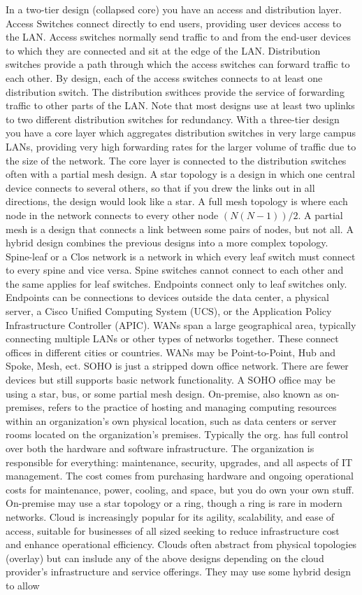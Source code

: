 \documentclass{article}
\begin{document}
	In a two-tier design (collapsed core) you have an access and distribution layer. Access Switches connect directly to end users, providing user devices access to the LAN. Access switches normally send traffic to and from the end-user devices to which they are connected and sit at the edge of the LAN. Distribution switches provide a path through which the access switches can forward traffic to each other. By design, each of the access switches connects to at least one distribution switch. The distribution swithces provide the service of forwarding traffic to other parts of the LAN. Note that most designs use at least two uplinks to two different distribution switches for redundancy. With a three-tier design you have a core layer which aggregates distribution switches in very large campus LANs, providing very high forwarding rates for the larger volume of traffic due to the size of the network. The core layer is connected to the distribution switches often with a partial mesh design. A star topology is a design in which one central device connects to several others, so that if you drew the links out in all directions, the design would look like a star. A full mesh topology is where each node in the network connects to every other node $(N(N-1))/2$. A partial mesh is a design that connects a link between some pairs of nodes, but not all. A hybrid design combines the previous designs into a more complex topology. Spine-leaf or a Clos network is a network in which every leaf switch must connect to every spine and vice versa. Spine switches cannot connect to each other and the same applies for leaf switches. Endpoints connect only to leaf switches only. Endpoints can be connections to devices outside the data center, a physical server, a Cisco Unified Computing System (UCS), or the Application Policy Infrastructure Controller (APIC). WANs span a large geographical area, typically connecting multiple LANs or other types of networks together. These connect offices in different cities or countries. WANs may be Point-to-Point, Hub and Spoke, Mesh, ect. SOHO is just a stripped down office network. There are fewer devices but still supports basic network functionality. A SOHO office may be using a star, bus, or some partial mesh design. On-premise, also known as on-premises, refers to the practice of hosting and managing computing resources within an organization's own physical location, such as data centers or server rooms located on the organization's premises. Typically the org. has full control over both the hardware and software infrastructure. The organization is responsible for everything: maintenance, security, upgrades, and all aspects of IT management. The cost comes from purchasing hardware and ongoing operational costs for maintenance, power, cooling, and space, but you do own your own stuff. On-premise may use a star topology or a ring, though a ring is rare in modern networks. Cloud is increasingly popular for its agility, scalability, and ease of access, suitable for businesses of all sized seeking to reduce infrastructure cost and enhance operational efficiency. Clouds often abstract from physical topologies (overlay) but can inslude any of the above designs depending on the cloud provider's infrastructure and service offerings. They may use some hybrid design to allow 
\end{document}
